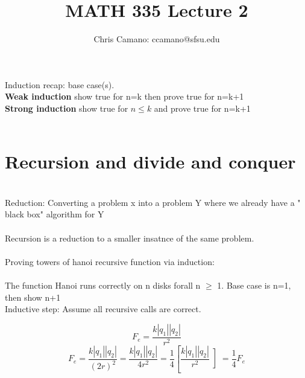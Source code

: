 \documentclass[12pt]{article}
\author{Chris Camano: ccamano@sfsu.edu}
\title{MATH 335  Lecture 2 }
\date
\newcommand{\sect}[1]{\section*{#1}}
\theoremstyle{definition}
\theoremstyle{remark}
\numberwithin{equation}{section}
\begin{document}
\maketitle
Induction recap: base case(s). \\
\textbf{Weak induction} show true for n=k then prove true for n=k+1\\
\textbf{Strong induction} show true for $n\leq k$ and prove true for n=k+1\\\\
\sect{Recursion and divide and conquer}\\
 Reduction: Converting a problem x into a problem Y where we already have a " black box" algorithm for Y\\\\
Recursion is a reduction to a smaller insatnce of the same problem. \\\\
Proving towers of hanoi recursive function via induction: \\\\
The function Hanoi runs correctly on n disks forall n $\geq$ 1. Base case is n=1, then show n+1\\ Inductive step: Assume all recursive calls are correct.


\[
  F_e=\frac{k|q_1||q_2|}{r^2}
\]
\[
  F_e=\frac{k|q_1||q_2|}{(2r)^2}=\frac{k|q_1||q_2|}{4r^2}=\frac{1}{4}\left[\frac{k|q_1||q_2|}{r^2}\left]=\frac{1}{4}F_e
\]
\end{document}
